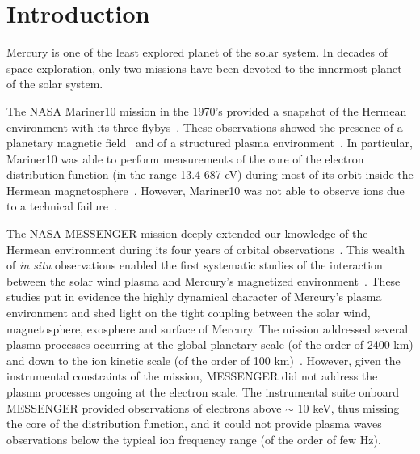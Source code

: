 \documentclass{aa}
\begin{document}

\maketitle


\section{Introduction}\label{sec:Introduction}

Mercury is one of the least explored planet of the solar system. In decades of space exploration, only two missions have been devoted to the innermost planet of the solar system. 

The NASA Mariner10 mission in the 1970's provided a snapshot of the Hermean environment with its three flybys~\citep{Russell1988}. These observations showed the presence of a planetary magnetic field~\citep{Ness1974} and of a structured plasma environment~\citep{Ogilvie1977}. In particular, Mariner10 was able to perform measurements of the core of the electron distribution function (in the range 13.4-687 eV) during most of its orbit inside the Hermean magnetosphere~\citep{Christon1987}. However, Mariner10 was not able to observe ions due to a technical failure~\citep{Ogilvie1974}.

The NASA MESSENGER mission deeply extended our knowledge of the Hermean environment during its four years of orbital observations~\citep{Solomon2018}. This wealth of \textit{in situ} observations enabled the first systematic studies of the interaction between the solar wind plasma and Mercury's magnetized environment~\citep[and references therein]{Raines2015}. These studies put in evidence the highly dynamical character of Mercury's plasma environment and shed light on the tight coupling between the solar wind, magnetosphere, exosphere and surface of Mercury. The mission addressed several plasma processes occurring at the global planetary scale (of the order of 2400 km) and down to the ion kinetic scale (of the order of 100 km)~\citep{Boardsen2012,Raines2014,Gershman2014,Gershman2015,Schmid2021}. However, given the instrumental constraints of the mission, MESSENGER did not address the plasma processes ongoing at the electron scale. The instrumental suite onboard MESSENGER provided observations of electrons above $\sim$ 10 keV, thus missing the core of the distribution function, and it could not provide plasma waves observations below the typical ion frequency range (of the order of few Hz). 
\end{document}
